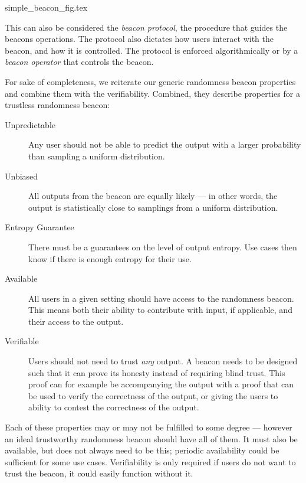 {simple_beacon_fig.tex}

This can also be considered the \emph{beacon protocol}, the procedure that guides the beacons operations.
The protocol also dictates how users interact with the beacon, and how it is controlled.
The protocol is enforced algorithmically or by a \emph{beacon operator} that controls the beacon.

For sake of completeness, we reiterate our generic randomness beacon properties and combine them with the verifiability.
Combined, they describe properties for a trustless randomness beacon:

\begin{description}
    \item[Unpredictable]
        Any user should not be able to predict the output with a larger probability than sampling a uniform distribution.
    \item[Unbiased]
        All outputs from the beacon are equally likely --- in other words, the output is statistically close to samplings from a uniform distribution.
    \item[Entropy Guarantee]
        There must be a guarantees on the level of output entropy.
Use cases then know if there is enough entropy for their use.
    \item[Available]
        All users in a given setting should have access to the randomness beacon.
        This means both their ability to contribute with input, if applicable, and their access to the output.
    \item[Verifiable]
        Users should not need to trust \emph{any} output.
        A beacon needs to be designed such that it can prove its honesty instead of requiring blind trust.
        This proof can for example be accompanying the output with a proof that can be used to verify the correctness of the output, or giving the users to ability to contest the correctness of the output.
\end{description}

Each of these properties may or may not be fulfilled to some degree --- however an ideal trustworthy randomness beacon should have all of them.%
It must also be available, but does not always need to be this; periodic availability could be sufficient for some use cases.
Verifiability is only required if users do not want to trust the beacon, it could easily function without it.

